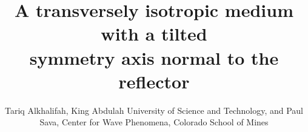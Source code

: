 



\title{A transversely isotropic medium with a tilted \\ symmetry axis normal to the reflector}
\author{
Tariq Alkhalifah, King Abdulah University of Science and Technology, and 
Paul Sava, Center for Wave Phenomena, Colorado School of Mines}
\maketitle











%




